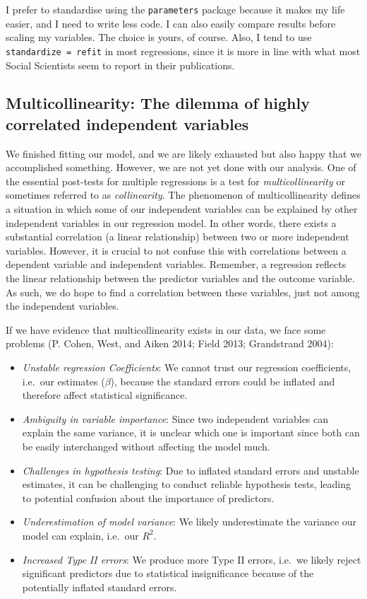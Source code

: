 \documentclass[
  letterpaper,
  DIV=11,
  numbers=noendperiod]{scrreprt}
\begin{document}
I prefer to standardise using the \texttt{parameters} package because it
makes my life easier, and I need to write less code. I can also easily
compare results before scaling my variables. The choice is yours, of
course. Also, I tend to use \texttt{standardize\ =\ refit} in most
regressions, since it is more in line with what most Social Scientists
seem to report in their publications.

\subsection{Multicollinearity: The dilemma of highly correlated
independent variables}\label{sec-multicollinearity}

We finished fitting our model, and we are likely exhausted but also
happy that we accomplished something. However, we are not yet done with
our analysis. One of the essential post-tests for multiple regressions
is a test for \emph{multicollinearity} or sometimes referred to as
\emph{collinearity}. The phenomenon of multicollinearity defines a
situation in which some of our independent variables can be explained by
other independent variables in our regression model. In other words,
there exists a substantial correlation (a linear relationship) between
two or more independent variables. However, it is crucial to not confuse
this with correlations between a dependent variable and independent
variables. Remember, a regression reflects the linear relationship
between the predictor variables and the outcome variable. As such, we do
hope to find a correlation between these variables, just not among the
independent variables.

If we have evidence that multicollinearity exists in our data, we face
some problems (P. Cohen, West, and Aiken 2014; Field 2013; Grandstrand
2004):

\begin{itemize}
\item
  \emph{Unstable regression Coefficients}: We cannot trust our
  regression coefficients, i.e.~our estimates (\(\beta\)), because the
  standard errors could be inflated and therefore affect statistical
  significance.
\item
  \emph{Ambiguity in variable importance}: Since two independent
  variables can explain the same variance, it is unclear which one is
  important since both can be easily interchanged without affecting the
  model much.
\item
  \emph{Challenges in hypothesis testing}: Due to inflated standard
  errors and unstable estimates, it can be challenging to conduct
  reliable hypothesis tests, leading to potential confusion about the
  importance of predictors.
\item
  \emph{Underestimation of model variance}: We likely underestimate the
  variance our model can explain, i.e.~our \(R^2\).
\item
  \emph{Increased Type II errors}: We produce more Type II errors,
  i.e.~we likely reject significant predictors due to statistical
  insignificance because of the potentially inflated standard errors.
\end{itemize}
\end{document}
